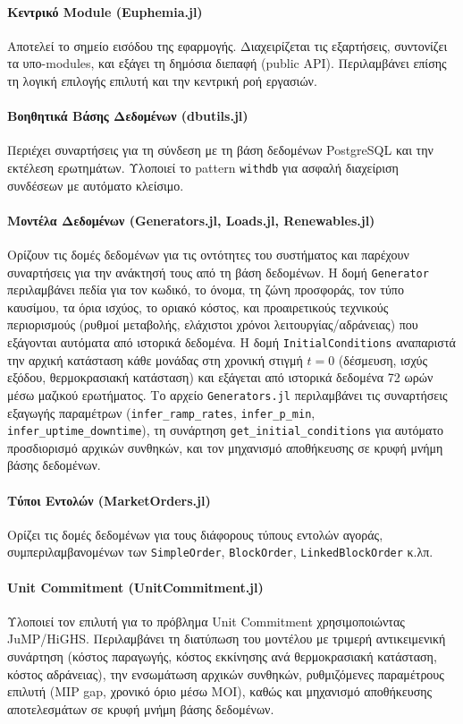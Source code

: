 \paragraph{Κεντρικό Module (Euphemia.jl)}
Αποτελεί το σημείο εισόδου της εφαρμογής. Διαχειρίζεται τις εξαρτήσεις, συντονίζει τα υπο-modules, και εξάγει τη δημόσια διεπαφή (public API). Περιλαμβάνει επίσης τη λογική επιλογής επιλυτή και την κεντρική ροή εργασιών.

\paragraph{Βοηθητικά Βάσης Δεδομένων (dbutils.jl)}
Περιέχει συναρτήσεις για τη σύνδεση με τη βάση δεδομένων PostgreSQL και την εκτέλεση ερωτημάτων. Υλοποιεί το pattern \texttt{withdb} για ασφαλή διαχείριση συνδέσεων με αυτόματο κλείσιμο.

\paragraph{Μοντέλα Δεδομένων (Generators.jl, Loads.jl, Renewables.jl)}
Ορίζουν τις δομές δεδομένων για τις οντότητες του συστήματος και παρέχουν συναρτήσεις για την ανάκτησή τους από τη βάση δεδομένων. Η δομή \texttt{Generator} περιλαμβάνει πεδία για τον κωδικό, το όνομα, τη ζώνη προσφοράς, τον τύπο καυσίμου, τα όρια ισχύος, το οριακό κόστος, και προαιρετικούς τεχνικούς περιορισμούς (ρυθμοί μεταβολής, ελάχιστοι χρόνοι λειτουργίας/αδράνειας) που εξάγονται αυτόματα από ιστορικά δεδομένα. Η δομή \texttt{InitialConditions} αναπαριστά την αρχική κατάσταση κάθε μονάδας στη χρονική στιγμή $t=0$ (δέσμευση, ισχύς εξόδου, θερμοκρασιακή κατάσταση) και εξάγεται από ιστορικά δεδομένα 72 ωρών μέσω μαζικού ερωτήματος. Το αρχείο \texttt{Generators.jl} περιλαμβάνει τις συναρτήσεις εξαγωγής παραμέτρων (\texttt{infer\_ramp\_rates}, \texttt{infer\_p\_min}, \texttt{infer\_uptime\_downtime}), τη συνάρτηση \texttt{get\_initial\_conditions} για αυτόματο προσδιορισμό αρχικών συνθηκών, και τον μηχανισμό αποθήκευσης σε κρυφή μνήμη βάσης δεδομένων.

\paragraph{Τύποι Εντολών (MarketOrders.jl)}
Ορίζει τις δομές δεδομένων για τους διάφορους τύπους εντολών αγοράς, συμπεριλαμβανομένων των \texttt{SimpleOrder}, \texttt{BlockOrder}, \texttt{LinkedBlockOrder} κ.λπ.

\paragraph{Unit Commitment (UnitCommitment.jl)}
Υλοποιεί τον επιλυτή για το πρόβλημα Unit Commitment χρησιμοποιώντας JuMP/HiGHS. Περιλαμβάνει τη διατύπωση του μοντέλου με τριμερή αντικειμενική συνάρτηση (κόστος παραγωγής, κόστος εκκίνησης ανά θερμοκρασιακή κατάσταση, κόστος αδράνειας), την ενσωμάτωση αρχικών συνθηκών, ρυθμιζόμενες παραμέτρους επιλυτή (MIP gap, χρονικό όριο μέσω MOI), καθώς και μηχανισμό αποθήκευσης αποτελεσμάτων σε κρυφή μνήμη βάσης δεδομένων.

